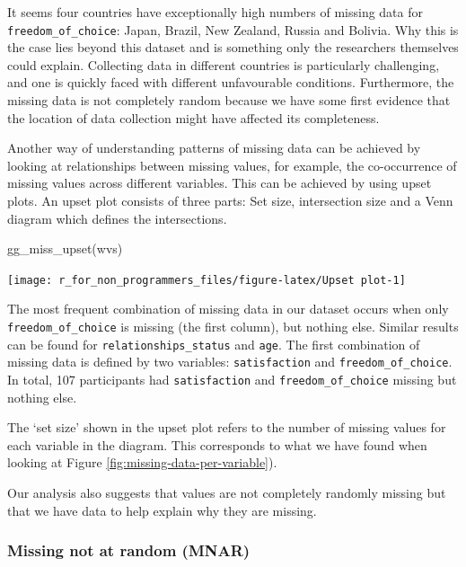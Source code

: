 \documentclass[
]{book}
\newenvironment{Shaded}{\begin{snugshade}}{\end{snugshade}}
\newcommand{\FunctionTok}[1]{\textcolor[rgb]{0.00,0.00,0.00}{#1}}
\newcommand{\NormalTok}[1]{#1}
\begin{document}
It seems four countries have exceptionally high numbers of missing data for \texttt{freedom\_of\_choice}: Japan, Brazil, New Zealand, Russia and Bolivia. Why this is the case lies beyond this dataset and is something only the researchers themselves could explain. Collecting data in different countries is particularly challenging, and one is quickly faced with different unfavourable conditions. Furthermore, the missing data is not completely random because we have some first evidence that the location of data collection might have affected its completeness.

Another way of understanding patterns of missing data can be achieved by looking at relationships between missing values, for example, the co-occurrence of missing values across different variables. This can be achieved by using upset plots. An upset plot consists of three parts: Set size, intersection size and a Venn diagram which defines the intersections.

\begin{Shaded}
\begin{Highlighting}[]
\FunctionTok{gg\_miss\_upset}\NormalTok{(wvs)}
\end{Highlighting}
\end{Shaded}

\begin{center}\texttt{[image: r\_for\_non\_programmers\_files/figure-latex/Upset plot-1]} \end{center}

The most frequent combination of missing data in our dataset occurs when only \texttt{freedom\_of\_choice} is missing (the first column), but nothing else. Similar results can be found for \texttt{relationships\_status} and \texttt{age}. The first combination of missing data is defined by two variables: \texttt{satisfaction} and \texttt{freedom\_of\_choice}. In total, 107 participants had \texttt{satisfaction} and \texttt{freedom\_of\_choice} missing but nothing else.

The `set size' shown in the upset plot refers to the number of missing values for each variable in the diagram. This corresponds to what we have found when looking at Figure \ref{fig:missing-data-per-variable}).

Our analysis also suggests that values are not completely randomly missing but that we have data to help explain why they are missing.

\hypertarget{missing-not-at-random-mnar}{%
\subsubsection{Missing not at random (MNAR)}\label{missing-not-at-random-mnar}}
\end{document}
